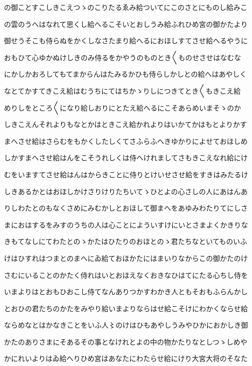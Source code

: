 \documentclass[a4paper,11pt,landscape]{ltjtarticle}
\begin{document}
の御ことすこしきこえつゝのこりたるゑみ給ついてにこのさとにものし給みこ
\par\medskip
の雲のうへはなれて思くし給へるこそいとおしうみ給ふれひめ宮の御かたより
\par\medskip
御せうそこも侍らぬをかくしなさたまり給へるにおほしすてさせ給へるやうに
\par\medskip
おもひて心ゆかぬけしきのみ侍るをかやうのものとき〱ものせさせはなむな
\par\medskip
にかしかおろしてもてまからんはたみるかひも侍らしかしとの給へはあやしく
\par\medskip
なとてかすてきこえ給はむうちにてはちかゝりしにつきてとき〱もきこえ給
\par\medskip
めりしをところ〱になり給しおりにとたえ給へるにこそあらめいまそゝのか
\par\medskip
しきこえんそれよりもなとかはときこえ給かれよりはいかてかはもとよりかす
\par\medskip
まへさせ給はさらむをもかくしたしくてさふらふへきゆかりによせておほしめ
\par\medskip
しかすまへさせ給はんをこそうれしくは侍へけれましてさもきこえなれ給にけ
\par\medskip
むをいますてさせ給はんはからきことに侍りとけいせさせ給をすきはみたるけ
\par\medskip
しきあるかとはおほしかけさりけりたちいてゝひとよの心さしの人にあはんあ
\par\medskip
りしわたとのもなくさめにみむかしとおほして御まへをあゆみわたりてにしさ
\par\medskip
まにおはするをみすのうちの人は心ことによういすけにいとさまよくかきりな
\par\medskip
きもてなしにてわたとのゝかたはひたりのおほとのゝ君たちなといてものいふ
\par\medskip
けはひすれはつまとのまへにゐ給ておほかたにはまいりなからこの御かたのけ
\par\medskip
さむにいることのかたく侍れはいとおほえなくおきなひはてにたる心ちし侍を
\par\medskip
いまよりはとおもひおこし侍てなんありつかすわかき人ともそおもふらんかし
\par\medskip
とおひの君たちのかたをみやり給いまよりならはせ給こそけにわかくならせ給
\par\medskip
ならめなとはかなきことをいふ人〻のけはひもあやしうみやひかにおかしき御
\par\medskip
かたのありさまにそあるその事となけれとよの中の物かたりなとしつゝしめや
\par\medskip
かにれいよりはゐ給へりひめ宮はあなたにわたらせ給にけり大宮大将のそなた
\end{document}
